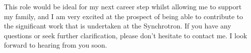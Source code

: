 \documentclass[10pt,a4paper,ragged2e,withhyper,paragraphstrue]{altacv}
\newcommand{\pind}{\hspace{24pt}}
\begin{document}
{	%
	\pind This role would be ideal for my next career step whilst allowing me to support my family, and I am very excited at the prospect of being able to contribute to the significant work that is undertaken at the Synchrotron. If you have any questions or seek further clarification, please don't hesitate to contact me. I look forward to hearing from you soon. 
%    
%  	
%  	    
%    
}
\end{document}
